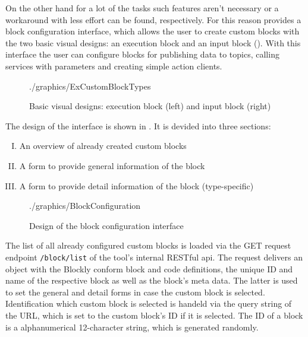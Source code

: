 On the other hand for a lot of the tasks such features aren't necessary or a workaround with less effort can be found, respectively. For this reason \toolname{} provides a block configuration interface, which allows the user to create custom blocks with the two basic visual designs: an execution block and an input block (). With this interface the user can configure blocks for publishing data to topics, calling services with parameters and creating simple action clients.

\begin{figure}[htbp]
	\centering
	\begin{overpic}[width=0.5\linewidth]{./graphics/ExCustomBlockTypes}
	\end{overpic}
	\caption{Basic visual designs: execution block (left) and input block (right)}%
	\label{fig:CustomBlockTypes}%
\end{figure}

The design of the interface is shown in . It is devided into three sections:
\begin{enumerate}[I.]
	\item An overview of already created custom blocks
	\item A form to provide general information of the block
	\item A form to provide detail information of the block (type-specific)
\end{enumerate}

\begin{figure}[htbp]
	\centering
	\begin{overpic}[width=0.8\linewidth]{./graphics/BlockConfiguration}
	\end{overpic}
	\caption{Design of the block configuration interface}%
	\label{fig:BlockConfiguration}%
\end{figure}

The list of all already configured custom blocks is loaded via the GET request endpoint \lstinline!/block/list! of the tool's internal RESTful \gls{api}. The request delivers an object with the Blockly conform block and code definitions, the unique ID and name of the respective block as well as the block's meta data. The latter is used to set the general and detail forms in case the custom block is selected. Identification which custom block is selected is handeld via the query string of the URL, which is set to the custom block's ID if it is selected. The ID of a block is a alphanumerical 12-character string, which is generated randomly. \\

